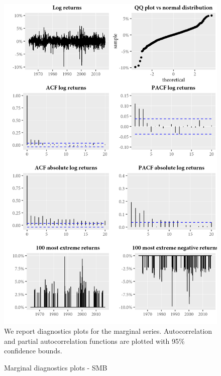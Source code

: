 \begin{figure}[H]
  \caption{Marginal diagnostics plots - SMB}
  \label{diag:marginaldiagSMB}
  \centering
  \begin{minipage}{\textwidth}
  \includegraphics[scale=1]{graphics/marginal/MarginalStats.SMB.Estim.png}  
  \vspace{3mm}
  \footnotesize
  We report diagnostics plots for the marginal series. Autocorrelation and partial autocorrelation functions are plotted with 95\% confidence bounds. 
  \end{minipage}
\end{figure}
